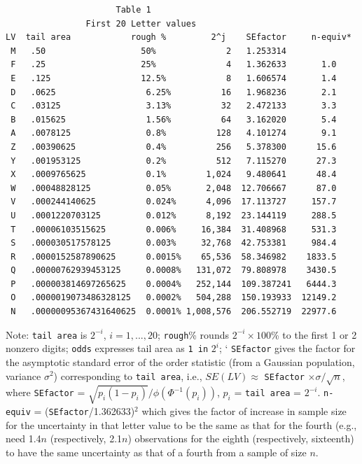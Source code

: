 \documentclass[11pt]{article}
\begin{document}
\begin{verbatim}
                      Table 1
                First 20 Letter values 
LV  tail area            rough %         2^j    SEfactor     n-equiv*
 M   .50                   50%              2   1.253314 
 F   .25                   25%              4   1.362633       1.0
 E   .125                  12.5%            8   1.606574       1.4
 D   .0625                  6.25%          16   1.968236       2.1
 C   .03125                 3.13%          32   2.472133       3.3
 B   .015625                1.56%          64   3.162020       5.4
 A   .0078125               0.8%          128   4.101274       9.1
 Z   .00390625              0.4%          256   5.378300      15.6
 Y   .001953125             0.2%          512   7.115270      27.3
 X   .0009765625            0.1%        1,024   9.480641      48.4
 W   .00048828125           0.05%       2,048  12.706667      87.0  
 V   .000244140625          0.024%      4,096  17.113727     157.7
 U   .0001220703125         0.012%      8,192  23.144119     288.5
 T   .00006103515625        0.006%     16,384  31.408968     531.3
 S   .000030517578125       0.003%     32,768  42.753381     984.4
 R   .0000152587890625      0.0015%    65,536  58.346982    1833.5
 Q   .00000762939453125     0.0008%   131,072  79.808978    3430.5
 P   .000003814697265625    0.0004%   252,144  109.387241   6444.3
 O   .0000019073486328125   0.0002%   504,288  150.193933  12149.2
 N   .00000095367431640625  0.0001% 1,008,576  206.552719  22977.6
\end{verbatim}

Note: \texttt{tail area} is $2 ^{-i}$, $i = 1, ..., 20$; 
\texttt{rough}\% rounds $2 ^{-i} \times 100$\%
   to the first 1 or 2 nonzero digits; 
\texttt{odds} expresses tail area as \texttt{1 in} $2^i$; `
\texttt{SEfactor} gives the factor for the asymptotic standard error
of the order statistic (from a Gaussian population, variance $\sigma^2$) 
corresponding to \texttt{tail area}, i.e., 
  $SE(LV) \approx$ \texttt{SEfactor} $\times \sigma / \sqrt{n}$,
where \texttt{SEfactor} = $\sqrt{p_i (1-p_i)} / \phi(\Phi^{-1}(p_i))$,
$p_i$ = \texttt{tail area} = $2^{-i}$.
\texttt{n-equiv} = (\texttt{SEfactor}/1.362633)$^2$ which gives
the factor of increase in sample size for the uncertainty in
that letter value to be the same as that for the fourth
(e.g., need 1.4$n$ (respectively, 2.1$n$) observations for the 
eighth (respectively, sixteenth) to have 
the same uncertainty as that of a fourth from a sample of size $n$.
\end{document}
